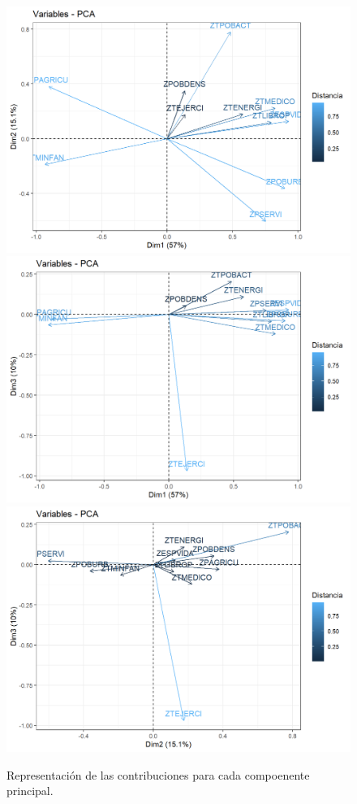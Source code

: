 \begin{figure}[H]
    \centering
    \includegraphics[scale=0.4]{cp1.png}
    \includegraphics[scale=0.4]{cp2.png}
    \includegraphics[scale=0.4]{cp3.png}
    \caption{Representación de las contribuciones para cada compoenente principal.}
\end{figure}

